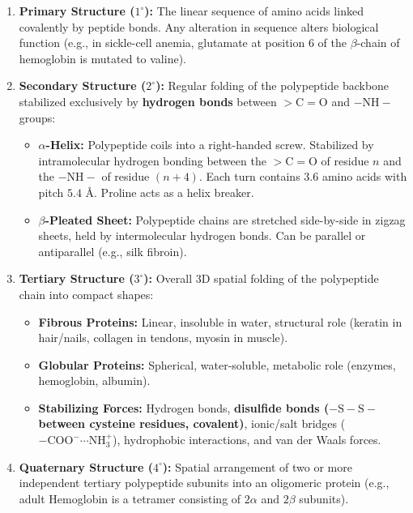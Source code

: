 \documentclass[10pt,a4paper]{article}
\begin{document}
\begin{formulabox}
\begin{enumerate}[leftmargin=*]
  \item \textbf{Primary Structure ($1^\circ$):} The linear sequence of amino acids linked covalently by peptide bonds. Any alteration in sequence alters biological function (e.g., in sickle-cell anemia, glutamate at position 6 of the $\beta$-chain of hemoglobin is mutated to valine).
  \item \textbf{Secondary Structure ($2^\circ$):} Regular folding of the polypeptide backbone stabilized exclusively by \textbf{hydrogen bonds} between $>\mathrm{C=O}$ and $-\mathrm{NH}-$ groups:
  \begin{itemize}
    \item \textbf{$\alpha$-Helix:} Polypeptide coils into a right-handed screw. Stabilized by intramolecular hydrogen bonding between the $>\mathrm{C=O}$ of residue $n$ and the $-\mathrm{NH}-$ of residue $(n+4)$. Each turn contains $3.6$ amino acids with pitch $5.4\text{ \AA}$. Proline acts as a helix breaker.
    \item \textbf{$\beta$-Pleated Sheet:} Polypeptide chains are stretched side-by-side in zigzag sheets, held by intermolecular hydrogen bonds. Can be parallel or antiparallel (e.g., silk fibroin).
  \end{itemize}
  \item \textbf{Tertiary Structure ($3^\circ$):} Overall 3D spatial folding of the polypeptide chain into compact shapes:
  \begin{itemize}
    \item \textbf{Fibrous Proteins:} Linear, insoluble in water, structural role (keratin in hair/nails, collagen in tendons, myosin in muscle).
    \item \textbf{Globular Proteins:} Spherical, water-soluble, metabolic role (enzymes, hemoglobin, albumin).
    \item \textbf{Stabilizing Forces:} Hydrogen bonds, \textbf{disulfide bonds ($-\mathrm{S-S-}$ between cysteine residues, covalent)}, ionic/salt bridges ($\mathrm{-COO^-\cdots NH_3^+}$), hydrophobic interactions, and van der Waals forces.
  \end{itemize}
  \item \textbf{Quaternary Structure ($4^\circ$):} Spatial arrangement of two or more independent tertiary polypeptide subunits into an oligomeric protein (e.g., adult Hemoglobin is a tetramer consisting of $2\alpha$ and $2\beta$ subunits).
\end{enumerate}
\end{formulabox}
\end{document}
